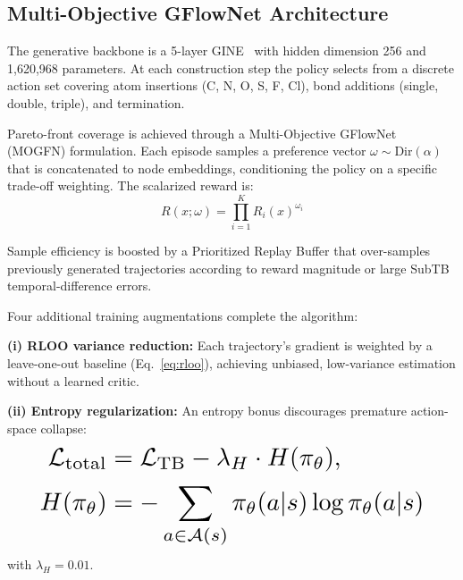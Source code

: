 \documentclass[twocolumn,10pt]{article}
\begin{document}
\begin{table}[!ht]
\centering
\caption{Surrogate model performance on held-out validation sets.}
\label{tab:surrogates}
\end{table}

\subsection{Multi-Objective GFlowNet Architecture}

The generative backbone is a 5-layer GINE~\cite{xu2019how} with hidden dimension 256 and 1,620,968 parameters. At each construction step the policy selects from a discrete action set covering atom insertions (C, N, O, S, F, Cl), bond additions (single, double, triple), and termination.

Pareto-front coverage is achieved through a Multi-Objective GFlowNet (MOGFN) formulation. Each episode samples a preference vector $\omega \sim \text{Dir}(\alpha)$ that is concatenated to node embeddings, conditioning the policy on a specific trade-off weighting. The scalarized reward is:
\begin{equation}
R(x; \omega) = \prod_{i=1}^{K} R_i(x)^{\omega_i}
\end{equation}

Sample efficiency is boosted by a Prioritized Replay Buffer that over-samples previously generated trajectories according to reward magnitude or large SubTB temporal-difference errors.

Four additional training augmentations complete the algorithm:

\textbf{(i) RLOO variance reduction:} Each trajectory's gradient is weighted by a leave-one-out baseline (Eq.~\ref{eq:rloo}), achieving unbiased, low-variance estimation without a learned critic.

\textbf{(ii) Entropy regularization:} An entropy bonus discourages premature action-space collapse:
\begin{equation}
\resizebox{0.89\linewidth}{!}{$
\begin{aligned}
\mathcal{L}_\text{total} &= \mathcal{L}_\text{TB} - \lambda_H \cdot H(\pi_\theta), \\
H(\pi_\theta) &= -\sum_{a \in \mathcal{A}(s)} \pi_\theta(a|s) \log \pi_\theta(a|s)
\end{aligned}
$}
\end{equation}
with $\lambda_H = 0.01$.
\end{document}

